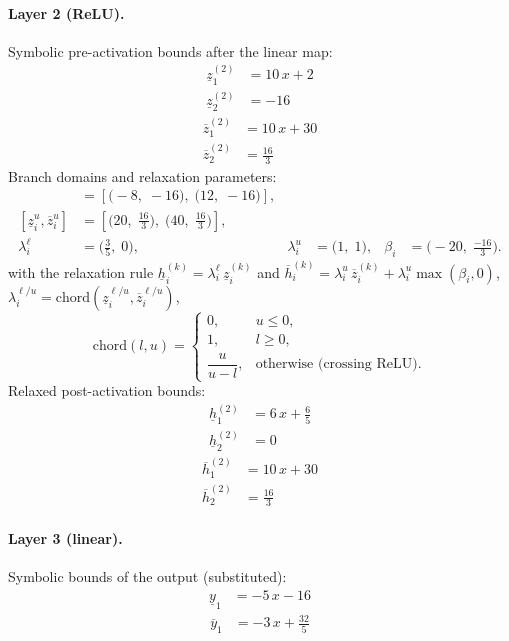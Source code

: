 \documentclass[11pt]{article}
\begin{document}
\paragraph{Layer 2 (ReLU).}
Symbolic pre-activation bounds after the linear map:
\begin{align*}
\underline{z}^{(2)}_{1} &= 10\,x + 2 \\
\underline{z}^{(2)}_{2} &= -16
\end{align*}
\begin{align*}
\overline{z}^{(2)}_{1} &= 10\,x + 30 \\
\overline{z}^{(2)}_{2} &= \frac{16}{3}
\end{align*}
Branch domains and relaxation parameters:
\begin{align*}
[\underline{z}^{\ell}_i, \overline{z}^{\ell}_i] &= [\bigl(-8,\; -16\bigr),\; \bigl(12,\; -16\bigr)], \\ 
[\underline{z}^{u}_i, \overline{z}^{u}_i] &= [\bigl(20,\; \frac{16}{3}\bigr),\; \bigl(40,\; \frac{16}{3}\bigr)], \\
\lambda^{\ell}_i &= \bigl(\frac{3}{5},\; 0\bigr), & \lambda^{u}_i &= \bigl(1,\; 1\bigr), & \beta_i &= \bigl(-20,\; \frac{-16}{3}\bigr).
\end{align*}
with the relaxation rule
$\underline{h}^{(k)}_i = \lambda^{\ell}_i\, \underline{z}^{(k)}_i$ and
$\overline{h}^{(k)}_i = \lambda^{u}_i\, \overline{z}^{(k)}_i + \lambda^{u}_i \max(\beta_i, 0)$,
$\lambda^{\ell/u}_i = \mathrm{chord}(\underline{z}_i^{\ell/u}, \overline{z}_i^{\ell/u})$,
\[
\mathrm{chord}(l, u) =
\begin{cases}
0, & u \le 0,\\
1, & l \ge 0,\\
\dfrac{u}{u - l}, & \text{otherwise (crossing ReLU)}.
\end{cases}\]
Relaxed post-activation bounds:
\begin{align*}
\underline{h}^{(2)}_{1} &= 6\,x + \frac{6}{5} \\
\underline{h}^{(2)}_{2} &= 0
\end{align*}
\begin{align*}
\overline{h}^{(2)}_{1} &= 10\,x + 30 \\
\overline{h}^{(2)}_{2} &= \frac{16}{3}
\end{align*}
\paragraph{Layer 3 (linear).}
Symbolic bounds of the output (substituted):
\begin{align*}
\underline{y}_{1} &= -5\,x - 16
\end{align*}
\begin{align*}
\overline{y}_{1} &= -3\,x + \frac{32}{5}
\end{align*}
\end{document}
